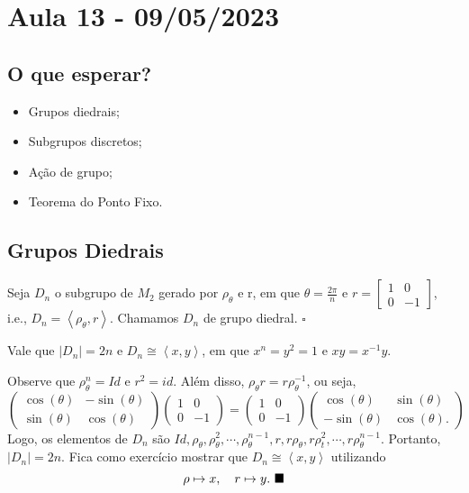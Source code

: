\documentclass[algebra_notes.tex]{subfiles}
\begin{document}
\section{Aula 13 - 09/05/2023}
\subsection{O que esperar?}
\begin{itemize}
	\item Grupos diedrais;
	\item Subgrupos discretos;
	\item Ação de grupo;
	\item Teorema do Ponto Fixo.
\end{itemize}
\subsection{Grupos Diedrais}
\begin{def*}
	Seja \(D_{n}\) o subgrupo de \(M_{2}\) gerado por \(\rho _{\theta }\) e r,
	em que \(\theta =\frac{2\pi }{n}\) e \(r = \begin{bmatrix}
		1 & 0  \\
		0 & -1
	\end{bmatrix}\), i.e., \(D_{n}=\left< \rho _{\theta }, r \right>.\) Chamamos
	\(D_{n}\) de grupo diedral. \(\square\)
\end{def*}
\begin{prop*}
	Vale que \(|D_{n}|=2n\) e \(D_{n}\cong{\left< x, y \right>}\), em que \(x^{n} = y^2=1\) e
	\(xy=x^{-1}y\).
\end{prop*}
\begin{proof*}
	Observe que \(\rho _{\theta }^{n} = Id\) e \(r^2 = id\). Além disso, \(\rho _{\theta }r = r\rho_{\theta }^{-1}\), ou seja,
	\[
		\begin{pmatrix}
			\cos{(\theta )} & -\sin{(\theta )} \\
			\sin{(\theta )} & \cos{(\theta )}
		\end{pmatrix}\begin{pmatrix}
			1 & 0  \\
			0 & -1
		\end{pmatrix} = \begin{pmatrix}
			1 & 0  \\
			0 & -1
		\end{pmatrix}\begin{pmatrix}
			\cos{(\theta )}  & \sin{(\theta )}  \\
			-\sin{(\theta )} & \cos{(\theta )}.
		\end{pmatrix}
	\]
	Logo, os elementos de \(D_{n}\) são \(Id, \rho _{\theta }, \rho _{\theta }^2, \cdots, \rho _{\theta }^{n-1},
	r, r\rho _{\theta }, r\rho _{t}^{2}, \cdots, r\rho _{\theta }^{n-1}\). Portanto,
	\(|D_{n}| = 2n\). Fica como exercício mostrar que \(D_{n}\cong{\left< x, y \right>}\) utilizando
	\[
		\rho \mapsto x, \quad r\mapsto y.\text{ $\blacksquare$}
	\]
\end{proof*}
\end{document}
